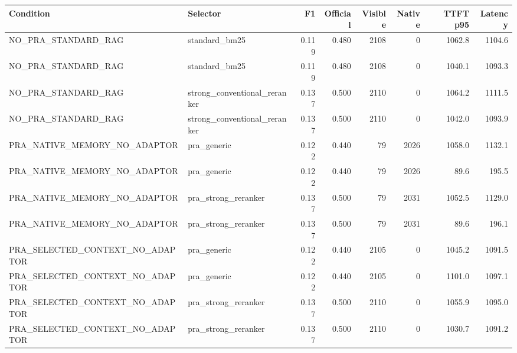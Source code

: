 \begin{tabular}{llrrrrrr}
\toprule
Condition & Selector & F1 & Official & Visible & Native & TTFT p95 & Latency \\
\midrule
NO\_PRA\_STANDARD\_RAG & standard\_bm25 & 0.119 & 0.480 & 2108 & 0 & 1062.8 & 1104.6 \\
NO\_PRA\_STANDARD\_RAG & standard\_bm25 & 0.119 & 0.480 & 2108 & 0 & 1040.1 & 1093.3 \\
NO\_PRA\_STANDARD\_RAG & strong\_conventional\_reranker & 0.137 & 0.500 & 2110 & 0 & 1064.2 & 1111.5 \\
NO\_PRA\_STANDARD\_RAG & strong\_conventional\_reranker & 0.137 & 0.500 & 2110 & 0 & 1042.0 & 1093.9 \\
PRA\_NATIVE\_MEMORY\_NO\_ADAPTOR & pra\_generic & 0.122 & 0.440 & 79 & 2026 & 1058.0 & 1132.1 \\
PRA\_NATIVE\_MEMORY\_NO\_ADAPTOR & pra\_generic & 0.122 & 0.440 & 79 & 2026 & 89.6 & 195.5 \\
PRA\_NATIVE\_MEMORY\_NO\_ADAPTOR & pra\_strong\_reranker & 0.137 & 0.500 & 79 & 2031 & 1052.5 & 1129.0 \\
PRA\_NATIVE\_MEMORY\_NO\_ADAPTOR & pra\_strong\_reranker & 0.137 & 0.500 & 79 & 2031 & 89.6 & 196.1 \\
PRA\_SELECTED\_CONTEXT\_NO\_ADAPTOR & pra\_generic & 0.122 & 0.440 & 2105 & 0 & 1045.2 & 1091.5 \\
PRA\_SELECTED\_CONTEXT\_NO\_ADAPTOR & pra\_generic & 0.122 & 0.440 & 2105 & 0 & 1101.0 & 1097.1 \\
PRA\_SELECTED\_CONTEXT\_NO\_ADAPTOR & pra\_strong\_reranker & 0.137 & 0.500 & 2110 & 0 & 1055.9 & 1095.0 \\
PRA\_SELECTED\_CONTEXT\_NO\_ADAPTOR & pra\_strong\_reranker & 0.137 & 0.500 & 2110 & 0 & 1030.7 & 1091.2 \\
\bottomrule
\end{tabular}
